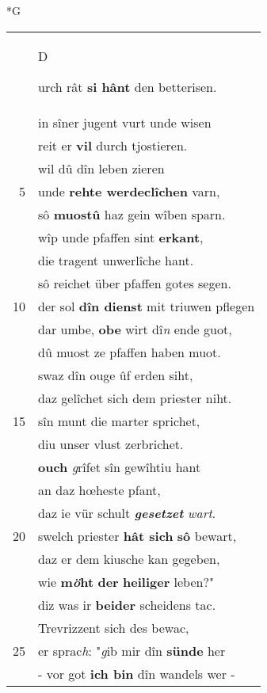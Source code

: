 \documentclass[8pt,a4paper,notitlepage]{article}
\begin{document}
\newpage
\begin{table}[ht]
\begin{minipage}[t]{0.5\linewidth}
\small
\begin{center}*G
\end{center}
\begin{tabular}{rl}
 & \begin{large}D\end{large}urch rât \textbf{si hânt} den betterisen.\\ 
 & in sîner jugent vurt unde wisen\\ 
 & reit er \textbf{vil} durch tjostieren.\\ 
 & wil dû dîn leben zieren\\ 
5 & unde \textbf{rehte werdeclîchen} varn,\\ 
 & sô \textbf{muostû} haz gein wîben sparn.\\ 
 & wîp unde pfaffen sint \textbf{erkant},\\ 
 & die tragent unwerlîche hant.\\ 
 & sô reichet über pfaffen gotes segen.\\ 
10 & der sol \textbf{dîn dienst} mit triuwen pflegen\\ 
 & dar umbe, \textbf{obe} wirt dî\textit{n} ende guot,\\ 
 & dû muost ze pfaffen haben muot.\\ 
 & swaz dîn ouge ûf erden siht,\\ 
 & daz gelîchet sich dem priester niht.\\ 
15 & sîn munt die marter sprichet,\\ 
 & diu unser vlust zerbrichet.\\ 
 & \textbf{ouch} \textit{g}rîfet sîn gewîhtiu hant\\ 
 & an daz hœheste pfant,\\ 
 & daz ie vür schult \textit{\textbf{gesetzet}} \textit{wart}.\\ 
20 & swelch priester \textbf{hât sich} \textbf{sô} bewart,\\ 
 & daz er dem kiusche kan gegeben,\\ 
 & wie \textbf{m\textit{ö}ht} \textbf{der} \textbf{heiliger} leben?"\\ 
 & diz was ir \textbf{beider} scheidens tac.\\ 
 & Trevrizzent sich des bewac,\\ 
25 & er sprac\textit{h}: "\textit{g}ib mir dîn \textbf{sünde} her\\ 
 & - vor got \textbf{ich bin} dîn wandels wer -\\ 

\end{tabular}
\end{minipage}
\end{table}
\end{document}
